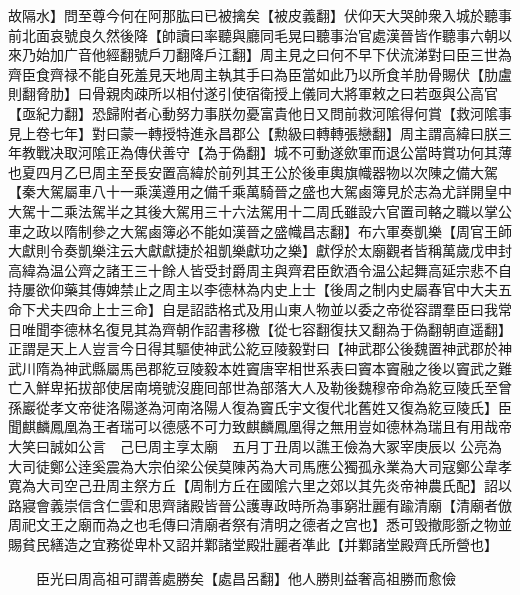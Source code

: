 故隔水】問至尊今何在阿那肱曰已被擒矣【被皮義翻】伏仰天大哭帥衆入城於聽事前北面哀號良久然後降【帥讀曰率聽與廳同毛晃曰聽事治官處漢晉皆作聽事六朝以來乃始加广音他經翻號戶刀翻降戶江翻】周主見之曰何不早下伏流涕對曰臣三世為齊臣食齊禄不能自死羞見天地周主執其手曰為臣當如此乃以所食羊肋骨賜伏【肋盧則翻脅肋】曰骨親肉疎所以相付遂引使宿衛授上儀同大將軍敕之曰若亟與公高官【亟紀力翻】恐歸附者心動努力事朕勿憂富貴他日又問前救河隂得何賞【救河隂事見上卷七年】對曰蒙一轉授特進永昌郡公【勲級曰轉轉張戀翻】周主謂高緯曰朕三年教戰决取河隂正為傳伏善守【為于偽翻】城不可動遂歛軍而退公當時賞功何其薄也夏四月乙巳周主至長安置高緯於前列其王公於後車輿旗幟器物以次陳之備大駕【秦大駕屬車八十一乘漢遵用之備千乘萬騎晉之盛也大駕鹵簿見於志為尤詳開皇中大駕十二乘法駕半之其後大駕用三十六法駕用十二周氏雖設六官置司輅之職以掌公車之政以隋制參之大駕鹵簿必不能如漢晉之盛幟昌志翻】布六軍奏凱樂【周官王師大獻則令奏凱樂注云大獻獻捷於祖凱樂獻功之樂】獻俘於太廟觀者皆稱萬歲戊申封高緯為温公齊之諸王三十餘人皆受封爵周主與齊君臣飲酒令温公起舞高延宗悲不自持屢欲仰藥其傳婢禁止之周主以李德林為内史上士【後周之制内史屬春官中大夫五命下犬夫四命上士三命】自是詔誥格式及用山東人物並以委之帝從容謂羣臣曰我常日唯聞李德林名復見其為齊朝作詔書移檄【從七容翻復扶又翻為于偽翻朝直遥翻】正謂是天上人豈言今日得其驅使神武公紇豆陵毅對曰【神武郡公後魏置神武郡於神武川隋為神武縣屬馬邑郡紇豆陵毅本姓竇唐宰相世系表曰竇本竇融之後以竇武之難亡入鮮卑拓拔部使居南境號沒鹿囘部世為部落大人及勒後魏穆帝命為紇豆陵氏至曾孫巖從孝文帝徙洛陽遂為河南洛陽人復為竇氏宇文復代北舊姓又復為紇豆陵氏】臣聞麒麟鳳凰為王者瑞可以德感不可力致麒麟鳳凰得之無用豈如德林為瑞且有用哉帝大笑曰誠如公言　己巳周主享太廟　五月丁丑周以譙王儉為大冢宰庚辰以公亮為大司徒鄭公逹奚震為大宗伯梁公侯莫陳芮為大司馬應公獨孤永業為大司寇鄭公韋孝寛為大司空己丑周主祭方丘【周制方丘在國隂六里之郊以其先炎帝神農氏配】詔以路寢會義崇信含仁雲和思齊諸殿皆晉公護專政時所為事窮壯麗有踰清廟【清廟者倣周祀文王之廟而為之也毛傳曰清廟者祭有清明之德者之宫也】悉可毁撤彫斵之物並賜貧民繕造之宜務從卑朴又詔并鄴諸堂殿壯麗者凖此【并鄴諸堂殿齊氏所營也】

　　臣光曰周高祖可謂善處勝矣【處昌呂翻】他人勝則益奢高祖勝而愈儉

